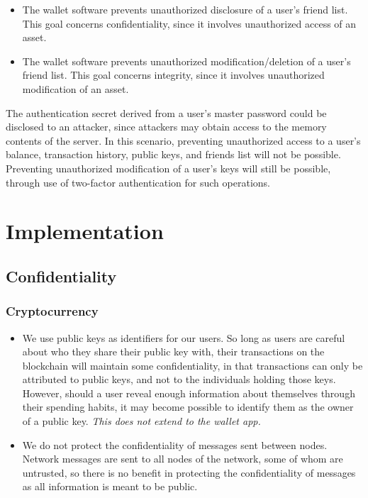 \documentclass[12pt]{article}
\begin{document}
\begin{itemize}
\item The wallet software prevents unauthorized disclosure of a user's friend list. This goal concerns confidentiality, since it involves unauthorized access of an asset.
\item The wallet software prevents unauthorized modification/deletion of a user's friend list. This goal concerns integrity, since it involves unauthorized modification of an asset.
\end{itemize}

The authentication secret derived from a user's master password could be disclosed to an attacker, since attackers may obtain access to the memory contents of the server.
In this scenario, preventing unauthorized access to a user's balance, transaction history, public keys, and friends list will not be possible.
Preventing unauthorized modification of a user's keys will still be possible, through use of two-factor authentication for such operations.

\section{Implementation}

\subsection{Confidentiality}

\subsubsection*{Cryptocurrency}

\begin{itemize}
	\item We use public keys as identifiers for our users. So long as users are careful about who they share their public key with, their transactions on the blockchain will maintain some confidentiality, in that transactions can only be attributed to public keys, and not to the individuals holding those keys.
	However, should a user reveal enough information about themselves through their spending habits, it may become possible to identify them as the owner of a public key.
	\textit{This does not extend to the wallet app.}
	\item We do not protect the confidentiality of messages sent between nodes.
	Network messages are sent to all nodes of the network, some of whom are untrusted, so there is no benefit in protecting the confidentiality of messages as all information is meant to be public.
\end{itemize}
\end{document}
